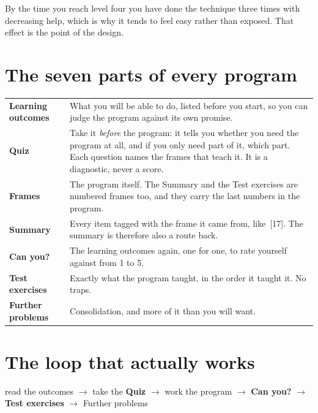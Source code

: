 \noindent
By the time you reach level four you have done the technique three times with
decreasing help, which is why it tends to feel easy rather than exposed. That
effect is the point of the design.

\section*{The seven parts of every program}

\begin{center}
\small
\begin{tabularx}{\linewidth}{@{}lX@{}}
\toprule
\textbf{Learning outcomes} & What you will be able to do, listed before you
  start, so you can judge the program against its own promise. \\
\textbf{Quiz} & Take it \emph{before} the program: it tells you whether you
  need the program at all, and if you only need part of it, which part. Each
  question names the frames that teach it. It is a diagnostic, never a score. \\
\textbf{Frames} & The program itself. The Summary and the Test exercises
  are numbered frames too, and they carry the last numbers in the program. \\
\textbf{Summary} & Every item tagged with the frame it came from,
  \mbox{like [17]}. The summary is therefore also a route back. \\
\textbf{Can you?} & The learning outcomes again, one for one, to rate yourself
  against from 1 to 5. \\
\textbf{Test exercises} & Exactly what the program taught, in the order it
  taught it. No traps. \\
\textbf{Further problems} & Consolidation, and more of it than you will want. \\
\bottomrule
\end{tabularx}
\end{center}

\section*{The loop that actually works}

\begin{center}
\begin{tcolorbox}[enhanced, sharp corners, width=0.94\linewidth,
  colback=mlight, colframe=mblue, boxrule=0pt, leftrule=3pt,
  left=10pt, right=10pt, top=8pt, bottom=8pt]
read the outcomes $\rightarrow$ take the \textbf{Quiz} $\rightarrow$ work the
program $\rightarrow$ \textbf{Can you?} $\rightarrow$ \textbf{Test exercises}
$\rightarrow$ Further problems
\end{tcolorbox}
\end{center}

